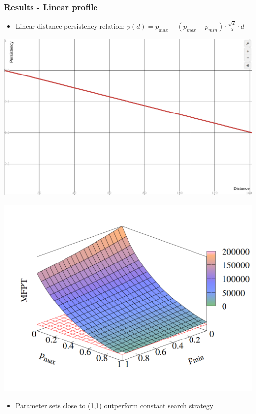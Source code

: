 \documentclass[11pt]{beamer}
\begin{document}
\begin{frame}
 \frametitle{Results - Linear profile}
 
 \begin{itemize}
  \item Linear distance-persistency relation:\newline
        $p\left(d\right)=p_{max}-\left(p_{max}-p_{min}\right)\cdot\frac{\sqrt{2}}{X}\cdot d$
 \end{itemize}
 \begin{minipage}[h]{0.49\textwidth}
  \centering
  \includegraphics[width=1.0\textwidth]{gfx/linearProfile.png}
 \end{minipage}
 \begin{minipage}[h]{0.49\textwidth}
  \centering
  \includegraphics[width=1.0\textwidth]{gfx/linMFPT-3D.png}
 \end{minipage}
 \begin{itemize}
  \item Parameter sets close to (1,1) outperform constant search strategy
 \end{itemize}
\end{frame}
\end{document}
